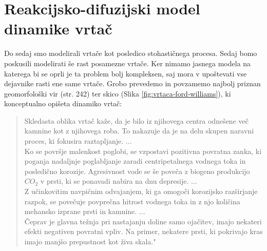 \documentclass[a4paper, twoside, 12pt]{book}
\begin{document}
\newpage
\section{Reakcijsko-difuzijski model dinamike vrtač}

Do sedaj smo modelirali vrtače kot posledico stohastičnega procesa. Sedaj bomo poskusili modelirati še rast posamezne vrtače. Ker nimamo jasnega modela na katerega bi se oprli je ta problem bolj kompleksen, saj mora v upoštevati vse dejavnike rasti ene same vrtače.
Grobo prevedemo in povzamemo najbolj priznan geomorfološki vir \cite{ford2007karst} (str. 242) ter skico (Slika \ref{fig:vrtaca-ford-williams}), ki konceptualno opišeta dinamiko vrtač:

\begin{quotation}
Skledasta oblika vrtač kaže, da je bilo iz njihovega centra odnešene več kamnine kot z njihovega roba. To nakazuje da je na delu skupen naravni proces, ki fokusira raztapljanje. ... \\
Ko se površje malenkost poglobi, se vzpostavi pozitivna povratna zanka, ki poganja nadaljnje poglabljanje zaradi centripetalnega vodnega toka in posledično korozije. Agresivnost vode se še poveča z biogeno produkcijo $CO_2$ v prsti, ki se ponavadi nabira na dnu depresije. ... \\
Z učinkovitim navpičnim odvajanjem, ki ga omogoči korozijsko razširjanje razpok, se povečuje povprečna hitrost vodnega toka in z njo količina mehansko izprane prsti in kamnine. ... \\
Čeprav je glavna težnja pri nastajanju doline samo ojačitev, imajo nekateri efekti negativen povratni vpliv. Na primer, nekatere prsti, ki pokrivajo kras imajo manjšo prepustnost kot živa skala."
\end{quotation}
\end{document}
